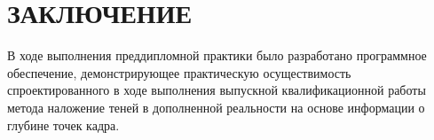 \chapter*{ЗАКЛЮЧЕНИЕ}

В ходе выполнения преддипломной практики было разработано программное обеспечение, демонстрирующее практическую осуществимость спроектированного в ходе выполнения выпускной квалификационной работы метода наложение теней в дополненной реальности на основе информации о глубине точек кадра.